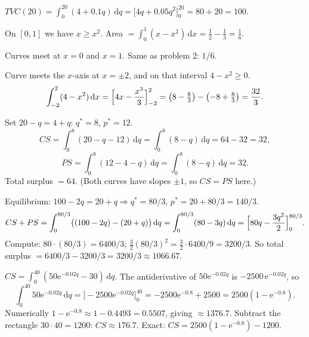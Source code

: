 \begin{solutions}
  \item $\displaystyle TVC(20)=\int_{0}^{20} (4+0.1q)\,\mathrm{d}q
        =\bigl[4q+0.05q^{2}\bigr]_{0}^{20}=80+20=100$.

  \item On $[0,1]$ we have $x\ge x^{2}$. Area
        $=\displaystyle\int_{0}^{1} (x-x^{2})\,\mathrm{d}x
        =\frac{1}{2}-\frac{1}{3}=\frac{1}{6}$.

  \item Curves meet at $x=0$ and $x=1$. Same as problem 2: $1/6$.

  \item Curve meets the $x$-axis at $x=\pm 2$, and on that interval
        $4-x^{2}\ge 0$.
        \[
          \int_{-2}^{2} (4-x^{2})\,\mathrm{d}x
            =\Bigl[4x-\frac{x^{3}}{3}\Bigr]_{-2}^{2}
            =\bigl(8-\tfrac{8}{3}\bigr)-\bigl(-8+\tfrac{8}{3}\bigr)=\frac{32}{3} .
        \]

  \item Set $20-q=4+q$: $q^{*}=8$, $p^{*}=12$.
        \[
          CS=\int_{0}^{8} (20-q-12)\,\mathrm{d}q=\int_{0}^{8}(8-q)\,\mathrm{d}q
            =64-32=32,
        \]
        \[
          PS=\int_{0}^{8} (12-4-q)\,\mathrm{d}q=\int_{0}^{8}(8-q)\,\mathrm{d}q=32 .
        \]
        Total surplus $=64$. (Both curves have slopes $\pm 1$, so
        $CS=PS$ here.)

  \item Equilibrium: $100-2q=20+q \Rightarrow q^{*}=80/3$,
        $p^{*}=20+80/3=140/3$.
        \[
          CS+PS=\int_{0}^{80/3} \bigl((100-2q)-(20+q)\bigr)\,\mathrm{d}q
            =\int_{0}^{80/3} (80-3q)\,\mathrm{d}q
            =\Bigl[80q-\frac{3q^{2}}{2}\Bigr]_{0}^{80/3} .
        \]
        Compute: $80\cdot(80/3)=6400/3$; $\frac{3}{2}(80/3)^{2}
        =\frac{3}{2}\cdot 6400/9=3200/3$. So total surplus
        $=6400/3-3200/3=3200/3\approx 1066.67$.

  \item $CS=\int_{0}^{40} (50\mathrm{e}^{-0.02q}-30)\,\mathrm{d}q$. The
        antiderivative of $50\mathrm{e}^{-0.02q}$ is
        $-2500\,\mathrm{e}^{-0.02q}$, so
        \[
          \int_{0}^{40} 50\mathrm{e}^{-0.02q}\,\mathrm{d}q
            =\bigl[-2500\mathrm{e}^{-0.02q}\bigr]_{0}^{40}
            =-2500\mathrm{e}^{-0.8}+2500=2500(1-\mathrm{e}^{-0.8}) .
        \]
        Numerically $1-\mathrm{e}^{-0.8}\approx 1-0.4493=0.5507$, giving
        $\approx 1376.7$. Subtract the rectangle $30\cdot 40=1200$:
        $CS\approx 176.7$. Exact: $CS=2500(1-\mathrm{e}^{-0.8})-1200$.


\end{solutions}
